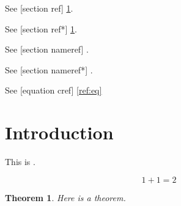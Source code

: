 \documentclass{amsart}
\newtheorem{theorem}{Theorem}
\begin{document}
See [section ref] \ref{sec:intro}.

See [section ref*] \ref*{sec:intro}.

See [section nameref] .

See [section nameref*] .

See [equation cref] \eqref{ref:eq}

\section{Introduction}
\label{sec:intro}

This is .

\begin{equation}
\label{ref:eq}
1 + 1 = 2
\end{equation}

\begin{theorem}\label{thm:1}
Here is a theorem.
\end{theorem}
\end{document}
